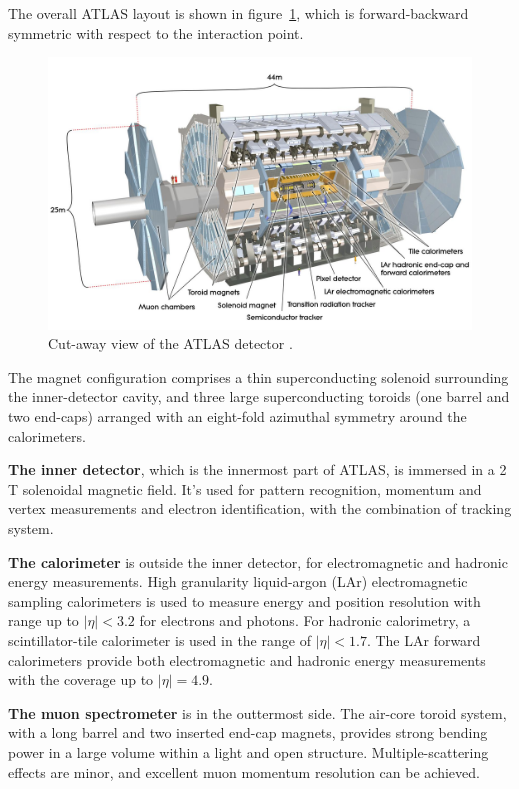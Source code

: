 The overall ATLAS layout is shown in figure~\ref{fig:atlas_layout}, which is forward-backward symmetric with respect to the interaction point.
\begin{figure}[!htb]
  \centering
  \includegraphics[width=1.0\textwidth]{figures/Detector/atlas_layout.jpg}
  \caption{Cut-away view of the ATLAS detector \cite{Pequenao:1095924}.}
  \label{fig:atlas_layout}
\end{figure}
The magnet configuration comprises a thin superconducting solenoid surrounding the inner-detector cavity, 
and three large superconducting toroids (one barrel and two end-caps) arranged with an eight-fold azimuthal symmetry around the calorimeters.

\textbf{The inner detector}, which is the innermost part of ATLAS, is immersed in a 2 T solenoidal magnetic field.
It's used for pattern recognition, momentum and vertex measurements and electron identification, with the combination of tracking system.

\textbf{The calorimeter} is outside the inner detector, for electromagnetic and hadronic energy measurements.
High granularity liquid-argon (LAr) electromagnetic sampling calorimeters is used to measure energy and position resolution with range up to $|\eta| < 3.2$ for electrons and photons.
For hadronic calorimetry, a scintillator-tile calorimeter is used in the range of $|\eta| < 1.7$.
The LAr forward calorimeters provide both electromagnetic and hadronic energy measurements with the coverage up to $|\eta| = 4.9$.

\textbf{The muon spectrometer} is in the outtermost side.
The air-core toroid system, with a long barrel and two inserted end-cap magnets, provides strong bending power in a large volume within a light and open structure.
Multiple-scattering effects are minor, and excellent muon momentum resolution can be achieved.
